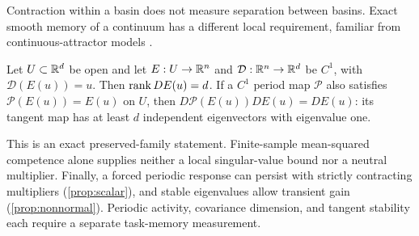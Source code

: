 Contraction within a basin does not measure separation between basins. Exact
smooth memory of a continuum has a different local requirement, familiar from
continuous-attractor models \citep{seung1996}.
\begin{proposition}
\label{prop:continuous}
Let $U\subset\mathbb{R}^d$ be open and let $E:U\to\mathbb{R}^n$ and
$\mathcal D:\mathbb{R}^n\to\mathbb{R}^d$ be $C^1$, with $\mathcal D(E(u))=u$.
Then $\operatorname{rank} DE(u)=d$. If a $C^1$ period map $\mathcal P$ also satisfies
$\mathcal P(E(u))=E(u)$ on $U$, then
$D\mathcal P(E(u))DE(u)=DE(u)$: its tangent map has at least $d$
independent eigenvectors with eigenvalue one.
\end{proposition}

This is an exact preserved-family statement. Finite-sample mean-squared
competence alone supplies neither a local singular-value bound nor a neutral
multiplier. Finally, a forced periodic response can persist with strictly
contracting multipliers (\cref{prop:scalar}), and stable eigenvalues allow
transient gain (\cref{prop:nonnormal}). Periodic activity, covariance dimension,
and tangent stability each require a separate task-memory measurement.
